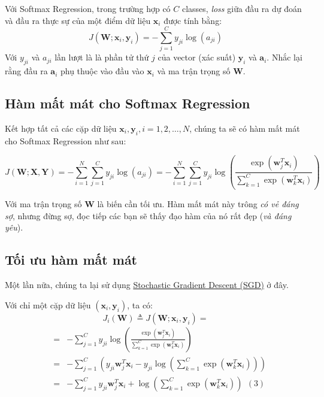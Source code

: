  
 
Với Softmax Regression, trong trường hợp có $C$ classes, \textit{loss} giữa đầu ra dự đoán và đầu ra thực sự của một điểm dữ liệu $\mathbf{x}_i$ được tính bằng: 
\begin{equation*} 
J(\mathbf{W};\mathbf{x}_i, \mathbf{y}_i) = -\sum_{j=1}^C y_{ji}\log(a_{ji}) 
\end{equation*} 
Với $y_{ji}$ và $ a_{ji}$ lần lượt là là phần tử thứ $j$ của vector (xác suất) $\mathbf{y}_i$ và $\mathbf{a}_i$. Nhắc lại rằng đầu ra $\mathbf{a}_i$ phụ thuộc vào đầu vào $\mathbf{x}_i$ và ma trận trọng số $\mathbf{W}$. 
 
 
\subsection{Hàm mất mát cho Softmax Regression }
Kết hợp tất cả các cặp dữ liệu $\mathbf{x}_i, \mathbf{y}_i, i = 1, 2, \dots, N$, chúng ta sẽ có hàm mất mát cho Softmax Regression như sau: 
 
\begin{equation}
J(\mathbf{W}; \mathbf{X}, \mathbf{Y}) = -\sum_{i = 1}^N \sum_{j = 1}^C y_{ji}\log(a_{ji}) = -\sum_{i = 1}^N \sum_{j = 1}^C y_{ji}\log\left(\frac{\exp(\mathbf{w}_j^T\mathbf{x}_i)}{\sum_{k=1}^C \exp(\mathbf{w}_k^T\mathbf{x}_i)}\right) 
\end{equation}
 
Với ma trận trọng số $\mathbf{W}$ là biến cần tối ưu. Hàm mất mát này trông \textit{có vẻ đáng sợ}, nhưng đừng sợ, đọc tiếp các bạn sẽ thấy đạo hàm của nó rất đẹp (\textit{và đáng yêu}).  
 
 
\subsection{Tối ưu hàm mất mát }
 
Một lần nữa, chúng ta lại sử dụng \href{http://machinelearningcoban.com/2017/01/16/gradientdescent2/#-stochastic-gradient-descent}{Stochastic Gradient Descent (SGD)} ở đây.  
 
Với chỉ một cặp dữ liệu $(\mathbf{x}_i, \mathbf{y}_i)$, ta có:  
\begin{equation*} 
J_i(\mathbf{W}) \triangleq J(\mathbf{W}; \mathbf{x}_i, \mathbf{y}_i) =  
\end{equation*} 
\begin{eqnarray*}
&=& -\sum_{j = 1}^C y_{ji}\log\left(\frac{\exp(\mathbf{w}_j^T\mathbf{x}_i)}{\sum_{k=1}^C \exp(\mathbf{w}_k^T\mathbf{x}_i)}\right) \\\ 
&=& -\sum_{j=1}^C\left(y_{ji} \mathbf{w}_j^T\mathbf{x}_i - y_{ji}\log\left(\sum_{k=1}^C \exp(\mathbf{w}_k^T\mathbf{x}_i)\right)\right) \\\ 
&=& -\sum_{j=1}^C y_{ji} \mathbf{w}_j^T\mathbf{x}_i + \log\left(\sum_{k=1}^C \exp(\mathbf{w}_k^T\mathbf{x}_i)\right) ~~ (3) 
\end{eqnarray*} 
 
